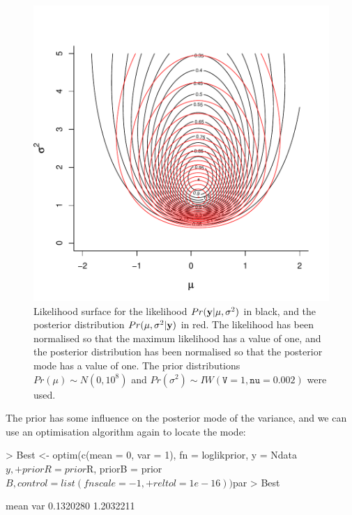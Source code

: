 \documentclass{article}
\begin{document}
\begin{figure}[!h]
\begin{center}
\includegraphics{Lecture1-034}
\end{center}
\caption{Likelihood surface for the likelihood $Pr({\bf y}|\mu, \sigma^{2})$ in black, and the posterior distribution $Pr(\mu, \sigma^{2} | {\bf y})$ in red.  The likelihood has been normalised so that the maximum likelihood has a value of one, and the posterior distribution has been normalised so that the posterior mode has a value of one. The prior distributions  $Pr(\mu)\sim N(0, 10^8)$ and  $Pr(\sigma^{2})\sim IW(\texttt{V}=1, \texttt{nu}=0.002)$ were used.}
\label{Psurface-fig}
\end{figure}


The prior has some influence on the posterior mode of the variance, and we can use an optimisation algorithm again to locate the mode:  

\begin{Schunk}
\begin{Sinput}
> Best <- optim(c(mean = 0, var = 1), fn = loglikprior, y = Ndata$y, 
+     priorR = prior$R, priorB = prior$B, control = list(fnscale = -1, 
+         reltol = 1e-16))$par
> Best
\end{Sinput}
\begin{Soutput}
     mean       var 
0.1320280 1.2032211 
\end{Soutput}
\end{Schunk}
\end{document}
